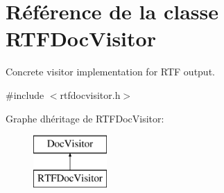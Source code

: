 \hypertarget{class_r_t_f_doc_visitor}{}\section{Référence de la classe R\+T\+F\+Doc\+Visitor}
\label{class_r_t_f_doc_visitor}


Concrete visitor implementation for R\+T\+F output.  




{\ttfamily \#include $<$rtfdocvisitor.\+h$>$}

Graphe d\textquotesingle{}héritage de R\+T\+F\+Doc\+Visitor\+:\begin{figure}[H]
\begin{center}
\leavevmode
\includegraphics[height=2.000000cm]{class_r_t_f_doc_visitor}
\end{center}
\end{figure}
